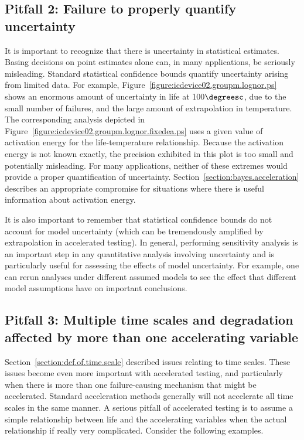 \subsection{Pitfall 2: Failure to properly quantify uncertainty}
It is important to recognize that there is uncertainty in
statistical estimates. Basing decisions on point estimates alone
can, in many applications, be seriously misleading.  Standard
statistical confidence bounds quantify uncertainty arising from
limited data.  For example,
Figure~\ref{figure:icdevice02.groupm.lognor.ps} shows an enormous
amount of uncertainty in life at 100$\degreesc$, due to the small
number of failures, and the large amount of extrapolation in
temperature.  The corresponding analysis depicted in
Figure~\ref{figure:icdevice02.groupm.lognor.fixedea.ps} uses a given
value of activation energy for the life-temperature relationship.
Because the activation energy is not known exactly, the precision
exhibited in this plot is too small and potentially misleading. For
many applications, neither of these extremes would provide a proper
quantification of uncertainty.
Section~\ref{section:bayes.acceleration} describes an appropriate
compromise for situations where there is useful information about
activation energy.

It is also important to remember that statistical confidence bounds
do not account for model uncertainty (which can be tremendously
amplified by extrapolation in accelerated testing).  In general,
performing sensitivity analysis is an important step in any
quantitative analysis involving uncertainty and is particularly
useful for assessing the effects of model uncertainty.  For example,
one can rerun analyses under different assumed models to see the
effect that different model assumptions have on important
conclusions.

\subsection{Pitfall 3: Multiple time scales and degradation affected
by more than one accelerating variable}

Section~\ref{section:def.of.time.scale} described issues relating to
time scales. These issues become even more important with
accelerated testing, and particularly when there is more than one
failure-causing mechanism that might be accelerated. Standard
acceleration methods generally will not accelerate all time scales
in the same manner. A serious pitfall of accelerated testing is to
assume a simple relationship between life and the accelerating
variables when the actual relationship if really very
complicated. Consider the following examples.

